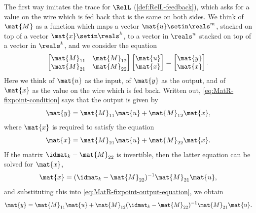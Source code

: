 The first way imitates the trace for $\RelL$ (\cref{def:RelL-feedback}), which asks for a value on the wire which is fed back that is the same on both sides.
We think of $\mat{M}$ as a function which maps a vector $\mat{u} \setin \reals^m$, stacked on top of a vector $\mat{x} \setin \reals^k$, to a vector in $\reals^n$ stacked on top of a vector in $\reals^k$, and we consider the equation
\begin{equation}
    \label{eq:MatR-fixpoint-condition}
    \begin{bmatrix}
        \mat{M}_{11} & \mat{M}_{12} \\
        \mat{M}_{21} & \mat{M}_{22}
    \end{bmatrix}
    \begin{bmatrix}
        \mat{u} \\
        \mat{x}
    \end{bmatrix}
    =
    \begin{bmatrix}
        \mat{y} \\
        \mat{x}
    \end{bmatrix}.
\end{equation}
Here we think of $\mat{u}$ as the input, of $\mat{y}$ as the output, and of $\mat{x}$ as the value on the wire which is fed back.
Written out, \cref{eq:MatR-fixpoint-condition} says that the output is given by
\begin{equation}
    \label{eq:MatR-fixpoint-output-equation}
    \mat{y} = \mat{M}_{11} \mat{u} + \mat{M}_{12} \mat{x},
\end{equation}
where $\mat{x}$ is required to satisfy the equation
\begin{equation}
    \label{eq:MatR-fixpoint-loop-equation}
    \mat{x} = \mat{M}_{21} \mat{u} + \mat{M}_{22} \mat{x}.
\end{equation}
If the matrix $\idmat_k - \mat{M}_{22}$ is invertible, then the latter equation can be solved for $\mat{x}$,
\begin{equation}
    \mat{x} = (\idmat_k - \mat{M}_{22})^{-1} \mat{M}_{21} \mat{u},
\end{equation}
and substituting this into \cref{eq:MatR-fixpoint-output-equation}, we obtain
\begin{equation}
    \mat{y} = \mat{M}_{11} \mat{u} + \mat{M}_{12} (\idmat_k - \mat{M}_{22})^{-1} \mat{M}_{21} \mat{u}.
\end{equation}

